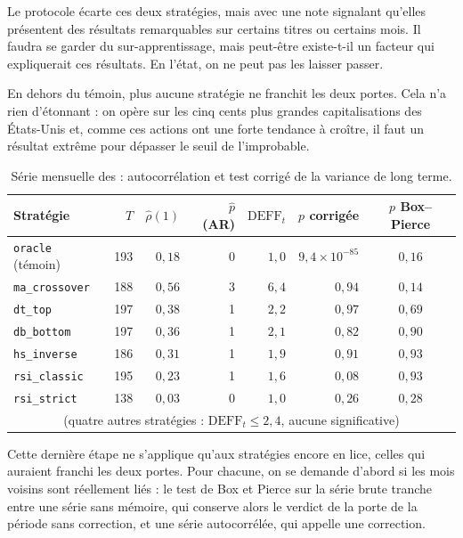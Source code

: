Le protocole écarte ces deux stratégies, mais avec une note signalant qu'elles
présentent des résultats remarquables sur certains titres ou certains mois.
Il faudra se garder du sur-apprentissage, mais peut-être existe-t-il un
facteur qui expliquerait ces résultats. En l'état, on ne peut pas les laisser
passer.

En dehors du témoin, plus aucune stratégie ne franchit les deux portes. Cela
n'a rien d'étonnant : on opère sur les cinq cents plus grandes capitalisations
des États-Unis et, comme ces actions ont une forte tendance à croître, il faut
un résultat extrême pour dépasser le seuil de l'improbable.



\begin{table}[H]
\centering
\caption{Série mensuelle des \edgevar{} : autocorrélation et test corrigé de
la variance de long terme.}
\label{tab:b1-dep-mensuel}
\small
\begin{tabular}{@{}lrrrrrc@{}}
\toprule
Stratégie & $T$ & $\hat\rho(1)$ & $\hat p$ (AR) & $\mathrm{DEFF}_t$ & $p$ corrigée & $p$ Box--Pierce \\
\midrule
\texttt{oracle} (témoin) & 193 & $0{,}18$ & 0 & $1{,}0$ & $9{,}4\times10^{-85}$ & $0{,}16$ \\
\midrule
\texttt{ma\_crossover} & 188 & $0{,}56$ & 3 & $6{,}4$ & $0{,}94$ & $0{,}14$ \\
\texttt{dt\_top}       & 197 & $0{,}38$ & 1 & $2{,}2$ & $0{,}97$ & $0{,}69$ \\
\texttt{db\_bottom}    & 197 & $0{,}36$ & 1 & $2{,}1$ & $0{,}82$ & $0{,}90$ \\
\texttt{hs\_inverse}   & 186 & $0{,}31$ & 1 & $1{,}9$ & $0{,}91$ & $0{,}93$ \\
\texttt{rsi\_classic}  & 195 & $0{,}23$ & 1 & $1{,}6$ & $0{,}08$ & $0{,}93$ \\
\texttt{rsi\_strict}   & 138 & $0{,}03$ & 0 & $1{,}0$ & $0{,}26$ & $0{,}28$ \\
\multicolumn{7}{c}{\footnotesize (quatre autres stratégies : $\mathrm{DEFF}_t \le 2{,}4$, aucune significative)} \\
\bottomrule
\end{tabular}
\end{table}



Cette dernière étape ne s'applique qu'aux stratégies encore en lice, celles
qui auraient franchi les deux portes. Pour chacune, on se demande d'abord si
les mois voisins sont réellement liés : le test de Box et Pierce sur la série
brute tranche entre une série sans mémoire, qui conserve alors le verdict de
la porte de la période sans correction, et une série autocorrélée, qui appelle
une correction.

